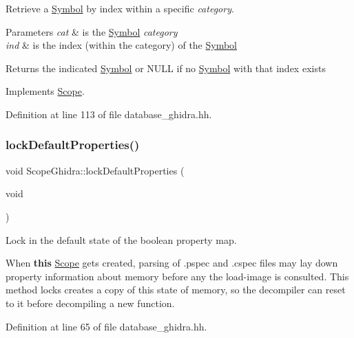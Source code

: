 Retrieve a \mbox{\hyperlink{class_symbol}{Symbol}} by index within a specific {\itshape category}. 


\begin{DoxyParams}{Parameters}
{\em cat} & is the \mbox{\hyperlink{class_symbol}{Symbol}} {\itshape category} \\
\hline
{\em ind} & is the index (within the category) of the \mbox{\hyperlink{class_symbol}{Symbol}} \\
\hline
\end{DoxyParams}
\begin{DoxyReturn}{Returns}
the indicated \mbox{\hyperlink{class_symbol}{Symbol}} or N\+U\+LL if no \mbox{\hyperlink{class_symbol}{Symbol}} with that index exists 
\end{DoxyReturn}


Implements \mbox{\hyperlink{class_scope_a491a168d7ea71f00da419dd864901ccb}{Scope}}.



Definition at line 113 of file database\+\_\+ghidra.\+hh.

\mbox{\label{class_scope_ghidra_a912898628da7cab6ec50207b9d9bd418}} 
\subsubsection{\texorpdfstring{lockDefaultProperties()}{lockDefaultProperties()}}
{\footnotesize\ttfamily void Scope\+Ghidra\+::lock\+Default\+Properties (\begin{DoxyParamCaption}\item[{void}]{ }\end{DoxyParamCaption})\hspace{0.3cm}{\ttfamily [inline]}}



Lock in the default state of the boolean property map. 

When {\bfseries{this}} \mbox{\hyperlink{class_scope}{Scope}} gets created, parsing of .pspec and .cspec files may lay down property information about memory before any the load-\/image is consulted. This method locks creates a copy of this state of memory, so the decompiler can reset to it before decompiling a new function. 

Definition at line 65 of file database\+\_\+ghidra.\+hh.

